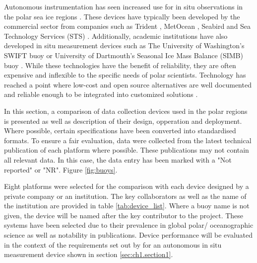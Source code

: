 Autonomous instrumentation has seen increased use for in situ observations in the polar sea ice regions \cite{kennicutt2016delivering}. These devices have typically  been developed by the commercial sector \cite{rabault2017measurements} from companies such as Trident \cite{trident}, MetOcean \cite{uptempo}, Seabird \cite{seabird2021website} and Sea Technology Services (STS) \cite{sts2021website}. Additionally, academic institutions have also developed in situ measurement devices such as The University of Washington's SWIFT buoy \cite{thomson2012wave} or University of Dartmouth's Seasonal Ice Mass Balance (SIMB) buoy \cite{polashenski2011seasonal}. While these technologies have the benefit of reliability, they are often expensive \cite{rabault2017measurements} and inflexible to the specific needs of polar scientists. Technology has reached a point where low-cost and open source alternatives are well documented and reliable enough to be integrated into customized solutions \cite{rabault2019open}.\par 


In this section, a comparison of data collection devices used in the polar regions is presented as well as  description of their design, opperation and deployment. Where possible, certain specifications have been converted into standardised formats. To ensure a fair evaluation, data were collected from the latest technical publication of each platform where possible. These publications may not contain all relevant data. In this case, the data entry has been marked with a "Not reported" or "NR". Figure \ref{fig:buoys}.


Eight platforms were selected for the comparison with each device designed by a private company or an institution. The key collaborators as well as the name of the institution are provided in table \ref{tab:device_list}. Where a buoy name is not given, the device will be named after the key contributor to the project. These systems have been selected due to their prevalence in global polar/ oceanographic science as well as notability in publications. Device performance will be evaluated in the context of the requirements set out by \textcite{kennicutt2016delivering} for an autonomous in situ measurement device shown in section \ref{sec:ch1.section1}. 

